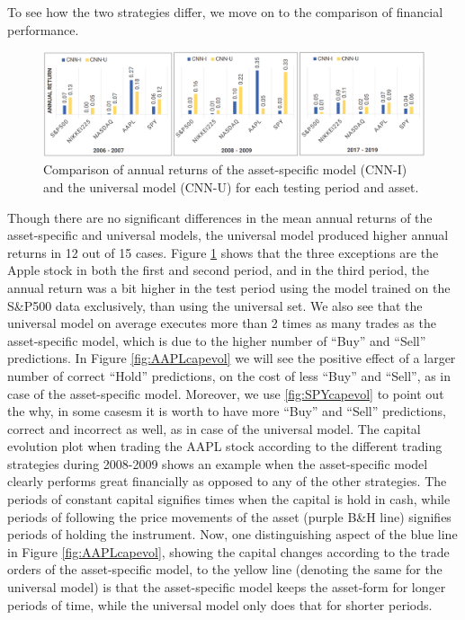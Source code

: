 \documentclass[11pt, a4paper]{article}
\begin{document}
To see how the two strategies differ, we move on to the comparison of financial performance.
\begin{figure}[ht]
    \centering
    \includegraphics[width=\textwidth]{images/CNNIvsCNNU.png}
    \caption{Comparison of annual returns of the asset-specific model (CNN-I) and the universal model (CNN-U) for each testing period and asset.}
    \label{fig:CNNIvsCNNU}
\end{figure}
Though there are no significant differences in the mean annual returns of the asset-specific and universal models, the universal model produced higher annual returns in 12 out of 15 cases. 
Figure \ref{fig:CNNIvsCNNU} shows that the three exceptions are the Apple stock in both the first and second period, and in the third period, the annual return was a bit higher in the test period using the model trained on the S\&P500 data exclusively, than using the universal set. We also see that the universal model on average executes more than 2 times as many trades as the asset-specific model, which is due to the higher number of “Buy” and “Sell” predictions. 
In Figure \ref{fig:AAPLcapevol} we will see the positive effect of a larger number of correct “Hold” predictions, on the cost of less “Buy” and “Sell”, as in case of the asset-specific model.
Moreover, we use \ref{fig:SPYcapevol} to point out the why, in some casesm it is worth to have more “Buy” and “Sell” predictions, correct and incorrect as well, as in case of the universal model. 
The capital evolution plot when trading the AAPL stock according to the different trading strategies during 2008-2009 shows an example when the asset-specific model clearly performs great financially as opposed to any of the other strategies. The periods of constant capital signifies times when the capital is hold in cash, while periods of following the price movements of the asset (purple B\&H line) signifies periods of holding the instrument. Now, one distinguishing aspect of the blue line in Figure \ref{fig:AAPLcapevol}, showing the capital changes according to the trade orders of the asset-specific model, to the yellow line (denoting the same for the universal model) is that the asset-specific model keeps the asset-form for longer periods of time, while the universal model only does that for shorter periods. 
\end{document}
